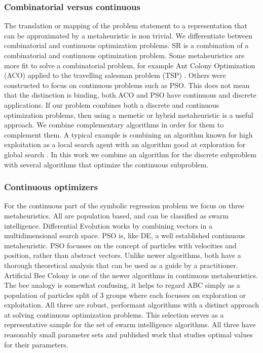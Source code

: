 \subsubsection{Combinatorial versus continuous}
The translation or mapping of the problem statement to a representation that can be approximated by a metaheuristic is non trivial.
We differentiate between combinatorial and continuous optimization problems. SR is a combination of a combinatorial and continuous optimization problem. Some metaheuristics are more fit to solve a combinatorial problem, for example Ant Colony Optimization (ACO) applied to the travelling salesman problem (TSP) \cite{ACO}. Others were constructed to focus on continuous problems such as PSO. This does not mean that the distinction is binding, both ACO and PSO have continuous and discrete applications. If our problem combines both a discrete and continuous optimization problems, then using a memetic or hybrid metaheuristic is a useful approach. We combine complementary algorithms in order for them to complement them. A typical example is combining an algorithm known for high exploitation as a local search agent with an algorithm good at exploration for global search \cite{ABCPSO}.
In this work we combine an algorithm for the discrete subproblem with several algorithms that optimize the continuous subproblem. 


\subsubsection{Continuous optimizers}
For the continuous part of the symbolic regression problem we focus on three metaheuristics. All are population based, and can be classified as swarm intelligence. Differential Evolution \cite{DE} works by combining vectors in a multidimensional search space. PSO is, like DE, a well established continuous metaheuristic. PSO focusses on the concept of particles with velocities and position, rather than abstract vectors. Unlike newer algorithms, both have a thorough theoretical analysis that can be used as a guide by a practitioner. Artificial Bee Colony \cite{ABC} is one of the newer algorithms in continuous metaheuristics. The bee analogy is somewhat confusing, it helps to regard ABC simply as a population of particles split of 3 groups where each focusses on exploration or exploitation. All three are robust, performant algorithms with a distinct approach at solving continuous optimization problems. This selection serves as a representative sample for the set of swarm intelligence algorithms. All three have reasonably small parameter sets and published work that studies optimal values for their parameters.

